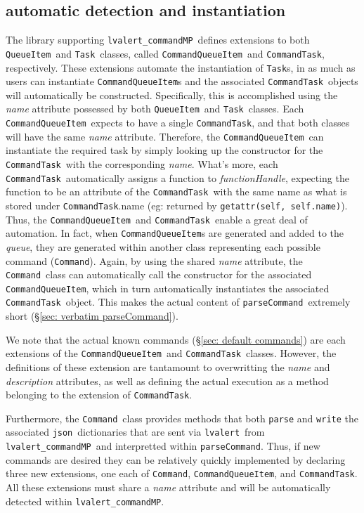 \documentclass{article}
\newcommand{\alert}{\texttt{lvalert}}
\newcommand{\lvalertCommandMP}{\texttt{lvalert\_commandMP}}
\newcommand{\parseCommand}{\texttt{parseCommand}}
\newcommand{\QueueItem}{\texttt{QueueItem}}
\newcommand{\Task}{\texttt{Task}}
\newcommand{\Command}{\texttt{Command}}
\newcommand{\CommandQueueItem}{\texttt{CommandQueueItem}}
\newcommand{\CommandTask}{\texttt{CommandTask}}
\newcommand{\json}{\texttt{json}}
\begin{document}

\subsection{automatic detection and instantiation}
\label{sec: automatic detection and instantiation}

The library supporting \lvalertCommandMP~defines extensions to both \QueueItem~and \Task~classes, called \CommandQueueItem~and \CommandTask, respectively.
These extensions automate the instantiation of {\Task}s, in as much as users can instantiate {\CommandQueueItem}s and the associated \CommandTask~objects will automatically be constructed.
Specifically, this is accomplished using the \textit{name} attribute possessed by both \QueueItem~and \Task~classes.
Each \CommandQueueItem~expects to have a single \CommandTask, and that both classes will have the same \textit{name} attribute. 
Therefore, the \CommandQueueItem~can instantiate the required task by simply looking up the constructor for the \CommandTask~with the corresponding \textit{name}.
What's more, each \CommandTask~automatically assigns a function to \textit{functionHandle}, expecting the function to be an attribute of the \CommandTask~with the same name as what is stored under \CommandTask.name (eg: returned by \texttt{getattr(self, self.name)}).
Thus, the \CommandQueueItem~and \CommandTask~enable a great deal of automation. 
In fact, when {\CommandQueueItem}s are generated and added to the \textit{queue}, they are generated within another class representing each possible command (\Command).
Again, by using the shared \textit{name} attribute, the \Command~class can automatically call the constructor for the associated \CommandQueueItem, which in turn automatically instantiates the associated \CommandTask~object.
This makes the actual content of \parseCommand~extremely short (\S\ref{sec: verbatim parseCommand}).

We note that the actual known commands (\S\ref{sec: default commands}) are each extensions of the \CommandQueueItem~and \CommandTask~classes.
However, the definitions of these extension are tantamount to overwritting the \textit{name} and \textit{description} attributes, as well as defining the actual execution as a method belonging to the extension of \CommandTask.

Furthermore, the \Command~class provides methods that both \texttt{parse} and \texttt{write} the associated \json~dictionaries that are sent via \alert~from \lvalertCommandMP~and interpretted within \parseCommand.
Thus, if new commands are desired they can be relatively quickly implemented by declaring three new extensions, one each of \Command, \CommandQueueItem, and \CommandTask.
All these extensions must share a \textit{name} attribute and will be automatically detected within \lvalertCommandMP.
\end{document}
